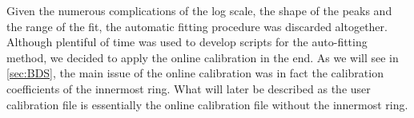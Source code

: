 \documentclass[twoside,english]{uiofysmaster/uiofysmaster}
\let\orgautoref\autoref
\renewcommand{\autoref}
        {%
		 \def\sectionautorefname{Section}%
		 \def\subsectionautorefname{Section}%
		 \def\subsubsectionautorefname{Section}%
		 \def\chapterautorefname{Chapter}%
          \orgautoref}
\begin{document}

Given the numerous complications of the log scale, the shape of the peaks and the range of the fit, the automatic fitting procedure was discarded altogether. 
Although plentiful of time was used to develop scripts for the auto-fitting method, we decided to apply the online calibration in the end.
As we will see in \autoref{sec:BDS}, the main issue of the online calibration was in fact the calibration coefficients of the innermost ring.
What will later be described as the user calibration file is essentially the online calibration file without the innermost ring.


\end{document}
